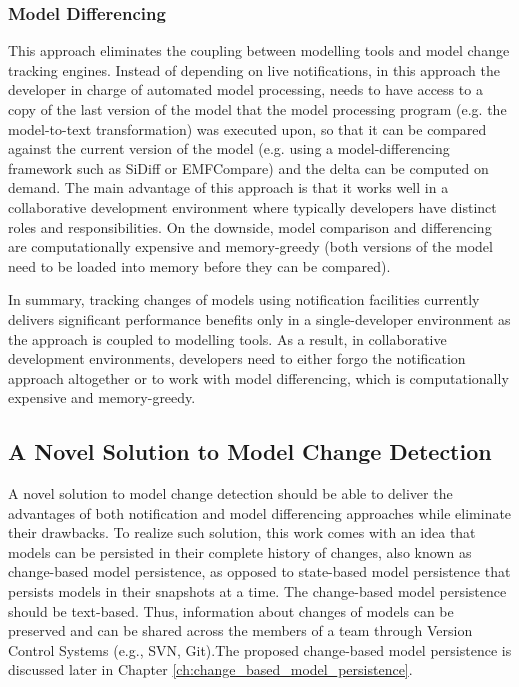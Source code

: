 \subsubsection{Model Differencing}
\label{sec:model_differencing}
  This approach eliminates the coupling between 
modelling tools and model change tracking engines. Instead of depending on 
live notifications, in this approach the developer in charge of automated model 
processing, needs to have access to a copy of the last version of the model that the model processing program (e.g. the model-to-text transformation) was 
executed upon, so that it can be compared against the current version of 
the model (e.g. using a model-differencing framework such as SiDiff or 
EMFCompare) and the delta can be computed on demand. The main advantage of 
this approach is that it works well in a collaborative development environment 
where typically developers have distinct roles and responsibilities. On the 
downside, model comparison and differencing are computationally expensive and 
memory-greedy (both versions of the model need to be loaded into memory before 
they can be compared).

In summary, tracking changes of models using notification facilities currently delivers significant performance benefits only in a single-developer environment as the approach is coupled to modelling tools. 
As a result, in collaborative development environments, 
developers need to either forgo the notification approach altogether 
or to work with model differencing, which is computationally expensive and 
memory-greedy.

\subsection{A Novel Solution to Model Change Detection}
\label{sec:a_novel_solution_to_model_change_detection}
A novel solution to model change detection should be able to deliver the advantages of both notification and model differencing approaches while eliminate their drawbacks. To realize such solution, this work comes with an idea that models can be persisted in their complete history of changes, also known as change-based model persistence, as opposed to state-based model persistence that persists models in their snapshots at a time. The change-based model persistence should be text-based. Thus, information about changes of models can be preserved and can be shared across the members of a team through Version Control Systems (e.g., SVN, Git).The proposed change-based model persistence is discussed later in Chapter \ref{ch:change_based_model_persistence}. 

